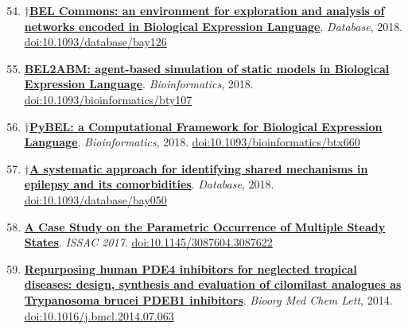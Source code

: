 \documentclass[10pt,a4paper,sans]{moderncv} %
\newcommand{\wikidata}[2]{\href{https://bioregistry.io/wikidata:#1?provider=scholia}{{#2}}}
\begin{document}
    \begin{enumerate}
    \setcounter{enumi}{53}
    \itemsep0.5em
        \item
        $\dagger$\wikidata{Q60302045}{\textbf{BEL Commons: an environment for exploration and analysis of networks encoded in Biological Expression Language}}.
    \textit{Database}, 2018.  {\scriptsize \href{https://bioregistry.io/doi:10.1093/DATABASE/BAY126}{doi:10.1093/database/bay126}}
        \item
        \wikidata{Q51056857}{\textbf{BEL2ABM: agent-based simulation of static models in Biological Expression Language}}.
    \textit{Bioinformatics}, 2018.  {\scriptsize \href{https://bioregistry.io/doi:10.1093/BIOINFORMATICS/BTY107}{doi:10.1093/bioinformatics/bty107}}
        \item
        $\dagger$\wikidata{Q42695788}{\textbf{PyBEL: a Computational Framework for Biological Expression Language}}.
    \textit{Bioinformatics}, 2018.  {\scriptsize \href{https://bioregistry.io/doi:10.1093/BIOINFORMATICS/BTX660}{doi:10.1093/bioinformatics/btx660}}
        \item
        $\dagger$\wikidata{Q55315340}{\textbf{A systematic approach for identifying shared mechanisms in epilepsy and its comorbidities}}.
    \textit{Database}, 2018.  {\scriptsize \href{https://bioregistry.io/doi:10.1093/DATABASE/BAY050}{doi:10.1093/database/bay050}}
    \end{enumerate}
    \begin{enumerate}
    \setcounter{enumi}{57}
    \itemsep0.5em
        \item
        \wikidata{Q47479157}{\textbf{A Case Study on the Parametric Occurrence of Multiple Steady States}}.
    \textit{ISSAC 2017}.  {\scriptsize \href{https://bioregistry.io/doi:10.1145/3087604.3087622}{doi:10.1145/3087604.3087622}}
    \end{enumerate}
    \begin{enumerate}
    \setcounter{enumi}{58}
    \itemsep0.5em
        \item
        \wikidata{Q34138086}{\textbf{Repurposing human PDE4 inhibitors for neglected tropical diseases: design, synthesis and evaluation of cilomilast analogues as Trypanosoma brucei PDEB1 inhibitors}}.
    \textit{Bioorg Med Chem Lett}, 2014.  {\scriptsize \href{https://bioregistry.io/doi:10.1016/J.BMCL.2014.07.063}{doi:10.1016/j.bmcl.2014.07.063}}
    \end{enumerate}
\end{document}
